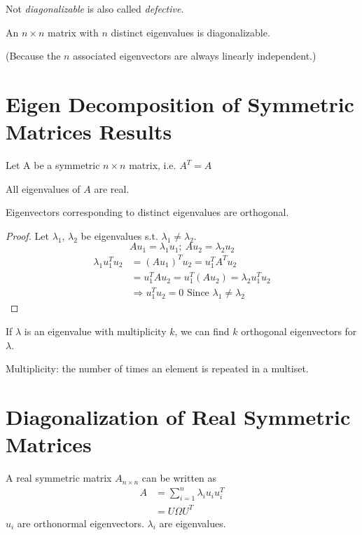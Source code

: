 \documentclass[11pt]{elegantbook}
\begin{document}
Not \textit{diagonalizable} is also called \textit{defective}.

\begin{theorem}
    An $n\times n$ matrix with $n$ distinct eigenvalues is diagonalizable.
\end{theorem}
(Because the $n$ associated eigenvectors are always linearly independent.)


\section{Eigen Decomposition of Symmetric Matrices Results}
Let A be a symmetric $n\times n$ matrix, i.e. $A^T=A$
\begin{proposition}
All eigenvalues of $A$ are real.
\end{proposition}
\begin{proposition}
Eigenvectors corresponding to distinct eigenvalues are orthogonal.
\end{proposition}
\begin{proof}
\quad

Let $\lambda_1$, $\lambda_2$ be eigenvalues s.t. $\lambda_1\neq\lambda_2$.
$$Au_1=\lambda_1 u_1;\ Au_2=\lambda_2 u_2$$
\begin{equation}
    \begin{aligned}
        \lambda_1 u_1^Tu_2&=(Au_1)^Tu_2=u^T_1A^Tu_2\\
        &=u^T_1Au_2=u^T_1(Au_2)=\lambda_2 u^T_1u_2\\
        &\Rightarrow	u_1^Tu_2=0\text{ Since }\lambda_1\neq\lambda_2
    \end{aligned}
    \nonumber
\end{equation}
\end{proof}

\begin{proposition}
If $\lambda$ is an eigenvalue with multiplicity $k$, we can find $k$ orthogonal eigenvectors for $\lambda$.
\end{proposition}
Multiplicity: the number of times an element is repeated in a multiset.

\section{Diagonalization of Real Symmetric Matrices}
A real symmetric matrix $A_{n\times n}$ can be written as
\begin{equation}
    \begin{aligned}
        A&=\sum_{i=1}^n\lambda_i u_iu_i^T\\
        &=U\Omega U^T
    \end{aligned}
    \nonumber
\end{equation}
$u_i$ are orthonormal eigenvectors. $\lambda_i$ are eigenvalues.
\end{document}
